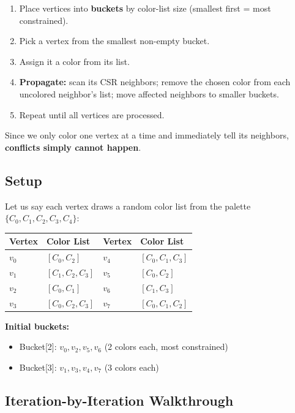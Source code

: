 \documentclass[11pt,letterpaper]{article}
\begin{document}
\begin{enumerate}[nosep]
  \item Place vertices into \textbf{buckets} by color-list size (smallest first = most constrained).
  \item Pick a vertex from the smallest non-empty bucket.
  \item Assign it a color from its list.
  \item \textbf{Propagate:} scan its CSR neighbors; remove the chosen color from each uncolored neighbor's list; move affected neighbors to smaller buckets.
  \item Repeat until all vertices are processed.
\end{enumerate}

Since we only color one vertex at a time and immediately tell its neighbors, \textbf{conflicts simply cannot happen}.

\subsection{Setup}

Let us say each vertex draws a random color list from the palette $\{C_0, C_1, C_2, C_3, C_4\}$:

\begin{center}
\begin{tabular}{ll@{\qquad}ll}
\toprule
Vertex & Color List & Vertex & Color List \\
\midrule
$v_0$ & $[C_0, C_2]$       & $v_4$ & $[C_0, C_1, C_3]$ \\
$v_1$ & $[C_1, C_2, C_3]$  & $v_5$ & $[C_0, C_2]$ \\
$v_2$ & $[C_0, C_1]$       & $v_6$ & $[C_1, C_3]$ \\
$v_3$ & $[C_0, C_2, C_3]$  & $v_7$ & $[C_0, C_1, C_2]$ \\
\bottomrule
\end{tabular}
\end{center}

\noindent\textbf{Initial buckets:}
\begin{itemize}[nosep]
  \item Bucket[2]: $v_0, v_2, v_5, v_6$ \quad(2 colors each, most constrained)
  \item Bucket[3]: $v_1, v_3, v_4, v_7$ \quad(3 colors each)
\end{itemize}

\subsection{Iteration-by-Iteration Walkthrough}
\end{document}
